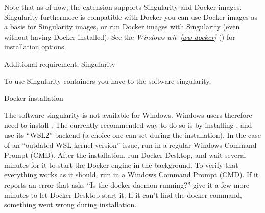 \sphinxAtStartPar
Note that as of now, the  extension supports
Singularity and Docker images.
Singularity furthermore is compatible with Docker \textendash{} you can use
Docker images as a basis for Singularity images, or run Docker images with
Singularity (even without having Docker installed).
See the \textit{Windows-wit}~{\windowswiticoninline}\textit{\ref{ww-docker}} {\hyperref[\detokenize{basics/101-133-containersrun:ww-docker}]{}} () for installation options.
\begin{importantnote}[before title={\thetcbcounter\ }, check odd page=true]{Additional requirement: Singularity}

\sphinxAtStartPar
To use Singularity containers you have to
 the software singularity.


\end{importantnote}

\ignorespaces \begin{windowswit}[label={ww-docker}, before title={\thetcbcounter\ }, float, floatplacement=tb, check odd page=true]{Docker installation}
\label{\detokenize{basics/101-133-containersrun:ww-docker}}

\sphinxAtStartPar
The software singularity is not available for Windows.
Windows users therefore need to install {\hyperref[\detokenize{glossary:term-Docker}]{}}.
The currently recommended way to do so is by installing , and use its “WSL2” backend (a choice one can set during the installation).
In the case of an “outdated WSL kernel version” issue, run  in a regular Windows Command Prompt (CMD).
After the installation, run Docker Desktop, and wait several minutes for it to start the Docker engine in the background.
To verify that everything works as it should, run  in a Windows Command Prompt (CMD).
If it reports an error that asks “Is the docker daemon running?” give it a few more minutes to let Docker Desktop start it.
If it can’t find the docker command, something went wrong during installation.


\end{windowswit}

